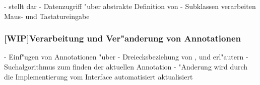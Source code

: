 -  stellt dar
- Datenzugriff "uber abstrakte Definition von 
- Subklassen verarbeiten Maus- und Tastatureingabe

\subsubsection{[WIP]Verarbeitung und Ver"anderung von Annotationen}

- Einf"ugen von Annotationen "uber 
- Dreiecksbeziehung von ,  und  erl"autern
- Suchalgorithmus zum finden der aktuellen Annotation
- "Anderung wird durch die Implementierung vom Interface  automatisiert aktualisiert

